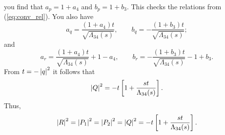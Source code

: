 you find that $a_{p} = 1 + a_{4}$ and $b_{p} = 1 + b_{3}$. This checks the relations from (\ref{eq:conv_rel}). You also have
\begin{equation}
	a_{q} = \frac{\left( 1 + a_{4} \right) t}{\sqrt{\Lambda_{34}(s)}}, \qquad
	b_{q} = -\frac{\left( 1 + b_{3} \right) t}{\sqrt{\Lambda_{34}(s)}};
\end{equation}
and
\begin{equation}
	a_{r} = \frac{\left( 1 + a_{4} \right) t}{\sqrt{\Lambda_{34}(s)}} + 1 - a_{4}, \qquad 
	b_{r} = - \frac{\left( 1 + b_{3} \right) t}{\sqrt{\Lambda_{34}(s)}} - 1 + b_{3}.
\end{equation}
From $t = -\left\lvert q \right\rvert^{2}$ it follows that
\begin{equation}
	\left\lvert Q \right\rvert^{2} = -t \left[ 1 + \frac{s t}{\Lambda_{34}(s)} \right].
\end{equation}
Thus,
\begin{equation}
	\left\lvert R \right\rvert^{2} = \left\lvert P_{1} \right\rvert^{2} = \left\lvert P_{2} \right\rvert^{2} = \left\lvert Q \right\rvert^{2} = -t \left[ 1 + \frac{s t}{\Lambda_{34}(s)} \right].
\end{equation}